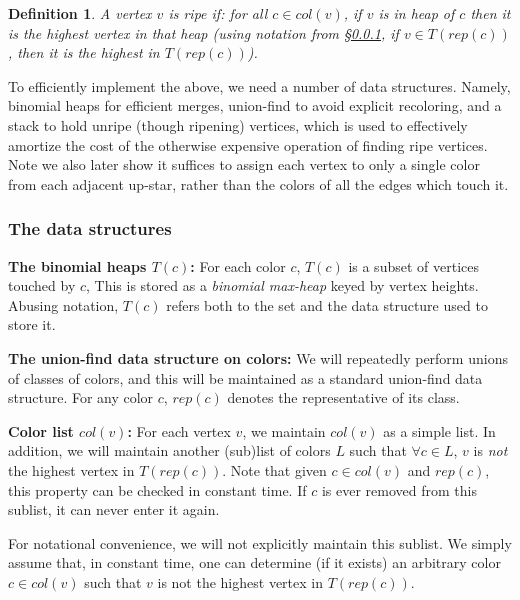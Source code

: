 \documentclass[11pt]{article}
\newtheorem{definition}[theorem]{Definition}
\theoremstyle{definition}
\newcommand{\Sec}[1]{\hyperref[sec:#1]{\S\ref*{sec:#1}}} %
\newcommand{\col}{col}
\newcommand{\fcol}{full}
\newcommand{\rep}{rep}
\newcommand{\touch}{T}
\begin{document}
\begin{definition} \label{def:ripe} A vertex $v$ is \emph{ripe} if: for all $c \in \col(v)$, 
if $v$ is in heap of $c$ then it is the highest vertex in that heap (using notation from \Sec{struct}, if $v\in T(\rep(c))$, then it is the highest in $T(\rep(c))$).
\end{definition} 

To efficiently implement the above, we need a number of data structures.  
Namely, binomial heaps for efficient merges, union-find to avoid explicit recoloring, 
and a stack to hold unripe (though ripening) vertices, which is used to effectively amortize the cost of 
the otherwise expensive operation of finding ripe vertices. 
Note we also later show it suffices to assign each vertex to only a single color from each adjacent up-star, 
rather than the colors of all the edges which touch it.
  


\subsubsection{The data structures} \label{sec:struct}
\noindent
{\bf The binomial heaps $\touch(c)$:} For each color $c$, $\touch(c)$ is a subset of vertices touched by $c$,
This is stored as a \emph{binomial max-heap} keyed by vertex heights. Abusing notation, $\touch(c)$ refers
both to the set and the data structure used to store it.

\medskip
\noindent
{\bf The union-find data structure on colors:} We will repeatedly perform unions
of classes of colors, and this will be maintained as a standard union-find data structure.
For any color $c$, $\rep(c)$ denotes the representative of its class. 

\medskip
\noindent
{\bf Color list $\col(v)$:} For each vertex $v$, we maintain $\col(v)$ as a simple list.
In addition, we will maintain another (sub)list of colors $L$ such that $\forall c \in L$,
$v$ is \emph{not} the highest vertex in $T(\rep(c))$. Note that given $c \in \col(v)$
and $\rep(c)$, this property can be checked in constant time. If $c$ is ever removed
from this sublist, it can never enter it again.

For notational convenience, we will not explicitly
maintain this sublist. We simply assume that, in constant
time, one can determine (if it exists) an arbitrary color $c \in \col(v)$ such that $v$ is not the highest vertex in $T(\rep(c))$.
\end{document}
